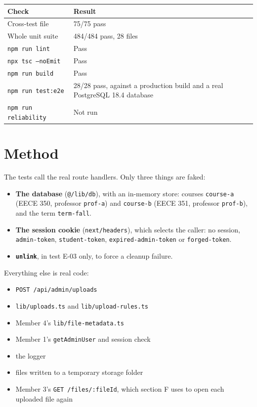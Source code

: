 \documentclass[10pt,a4paper]{article}
\begin{document}
\begin{tabular}{@{}ll@{}}
\toprule \textbf{Check} & \textbf{Result} \\ \midrule
Cross-test file & 75/75 pass \\
Whole unit suite & 484/484 pass, 28 files \\
\texttt{npm run lint} & Pass \\
\texttt{npx tsc --noEmit} & Pass \\
\texttt{npm run build} & Pass \\
\texttt{npm run test:e2e} & 28/28 pass, against a production build and a real PostgreSQL 18.4 database \\
\texttt{npm run reliability} & Not run \\
\bottomrule
\end{tabular}

\section*{Method}
The tests call the real route handlers. Only three things are faked:
\begin{itemize}[nosep]
\item \textbf{The database} (\texttt{@/lib/db}), with an in-memory store: courses \texttt{course-a} (EECE 350, professor \texttt{prof-a}) and \texttt{course-b} (EECE 351, professor \texttt{prof-b}), and the term \texttt{term-fall}.
\item \textbf{The session cookie} (\texttt{next/headers}), which selects the caller: no session, \texttt{admin-token}, \texttt{student-token}, \texttt{expired-admin-token} or \texttt{forged-token}.
\item \textbf{\texttt{unlink}}, in test E-03 only, to force a cleanup failure.
\end{itemize}
Everything else is real code:
\begin{itemize}[nosep]
\item \texttt{POST /api/admin/uploads}
\item \texttt{lib/uploads.ts} and \texttt{lib/upload-rules.ts}
\item Member 4's \texttt{lib/file-metadata.ts}
\item Member 1's \texttt{getAdminUser} and session check
\item the logger
\item files written to a temporary storage folder
\item Member 3's \texttt{GET /files/:fileId}, which section F uses to open each uploaded file again
\end{itemize}
\end{document}
